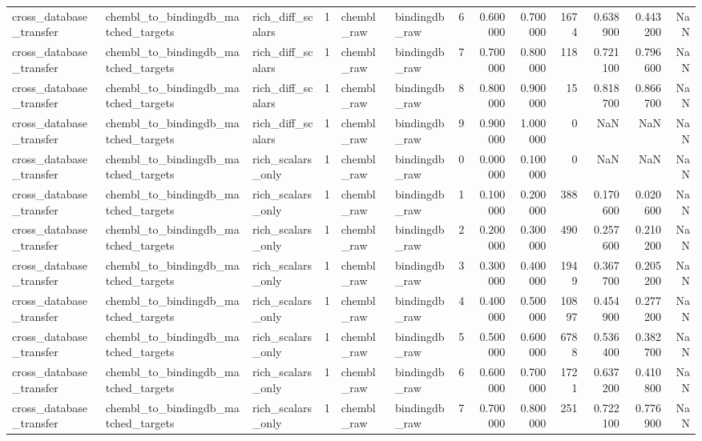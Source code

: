 \begin{longtable}{lllrllrrrrrrr}
cross\_database\_transfer & chembl\_to\_bindingdb\_matched\_targets & rich\_diff\_scalars & 1 & chembl\_raw & bindingdb\_raw & 6 & 0.600000 & 0.700000 & 1674 & 0.638900 & 0.443200 & NaN \\
cross\_database\_transfer & chembl\_to\_bindingdb\_matched\_targets & rich\_diff\_scalars & 1 & chembl\_raw & bindingdb\_raw & 7 & 0.700000 & 0.800000 & 118 & 0.721100 & 0.796600 & NaN \\
cross\_database\_transfer & chembl\_to\_bindingdb\_matched\_targets & rich\_diff\_scalars & 1 & chembl\_raw & bindingdb\_raw & 8 & 0.800000 & 0.900000 & 15 & 0.818700 & 0.866700 & NaN \\
cross\_database\_transfer & chembl\_to\_bindingdb\_matched\_targets & rich\_diff\_scalars & 1 & chembl\_raw & bindingdb\_raw & 9 & 0.900000 & 1.000000 & 0 & NaN & NaN & NaN \\
cross\_database\_transfer & chembl\_to\_bindingdb\_matched\_targets & rich\_scalars\_only & 1 & chembl\_raw & bindingdb\_raw & 0 & 0.000000 & 0.100000 & 0 & NaN & NaN & NaN \\
cross\_database\_transfer & chembl\_to\_bindingdb\_matched\_targets & rich\_scalars\_only & 1 & chembl\_raw & bindingdb\_raw & 1 & 0.100000 & 0.200000 & 388 & 0.170600 & 0.020600 & NaN \\
cross\_database\_transfer & chembl\_to\_bindingdb\_matched\_targets & rich\_scalars\_only & 1 & chembl\_raw & bindingdb\_raw & 2 & 0.200000 & 0.300000 & 490 & 0.257600 & 0.210200 & NaN \\
cross\_database\_transfer & chembl\_to\_bindingdb\_matched\_targets & rich\_scalars\_only & 1 & chembl\_raw & bindingdb\_raw & 3 & 0.300000 & 0.400000 & 1949 & 0.367700 & 0.205200 & NaN \\
cross\_database\_transfer & chembl\_to\_bindingdb\_matched\_targets & rich\_scalars\_only & 1 & chembl\_raw & bindingdb\_raw & 4 & 0.400000 & 0.500000 & 10897 & 0.454900 & 0.277200 & NaN \\
cross\_database\_transfer & chembl\_to\_bindingdb\_matched\_targets & rich\_scalars\_only & 1 & chembl\_raw & bindingdb\_raw & 5 & 0.500000 & 0.600000 & 6788 & 0.536400 & 0.382700 & NaN \\
cross\_database\_transfer & chembl\_to\_bindingdb\_matched\_targets & rich\_scalars\_only & 1 & chembl\_raw & bindingdb\_raw & 6 & 0.600000 & 0.700000 & 1721 & 0.637200 & 0.410800 & NaN \\
cross\_database\_transfer & chembl\_to\_bindingdb\_matched\_targets & rich\_scalars\_only & 1 & chembl\_raw & bindingdb\_raw & 7 & 0.700000 & 0.800000 & 251 & 0.722100 & 0.776900 & NaN \\

\end{longtable}

